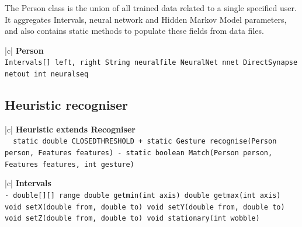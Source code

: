 \documentclass[12pt,a4,notitlepage]{report}
\renewcommand{\_}{\texttt{\symbol{95}}}
\newcommand{\<}{\texttt{\symbol{60}}}
\renewcommand{\>}{\texttt{\symbol{62}}}
\newcommand{\class}[1]{\textbf{#1}}
\newcommand{\variable}[1]{\texttt{#1}}
\begin{document}
The Person class is the union of all trained data related to a single specified user. It aggregates Intervals, neural network and Hidden Markov Model parameters, and also contains static methods to populate these fields from data files.

\begin{tabular}{|c|} \hline 
\class{Person} \\ \hline
{}
{\variable{Intervals[] left, right \newline String neural\_file \newline NeuralNet nnet \newline DirectSynapse netout \newline int neural\_seq 
} } \\ \hline
\end{tabular}

\newpage

\subsection{Heuristic recogniser}

\begin{tabular}{|c|} \hline 
\class{Heuristic extends Recogniser} \\ \hline
{}
{\variable{\ \ static double CLOSED\_THRESHOLD \newline
 + static Gesture recognise(Person person, Features features) \newline
 - static boolean Match(Person person, Features features, int gesture)
} } \\ \hline
\end{tabular}

\begin{tabular}{|c|} \hline 
\class{Intervals} \\ \hline
{}
{\variable{- double[][] range \newline
  double get\_min(int axis) \newline
  double get\_max(int axis) \newline
  void setX(double from, double to) \newline
  void setY(double from, double to) \newline
  void setZ(double from, double to) \newline
  void stationary(int wobble)
} } \\ \hline
\end{tabular}
\end{document}
